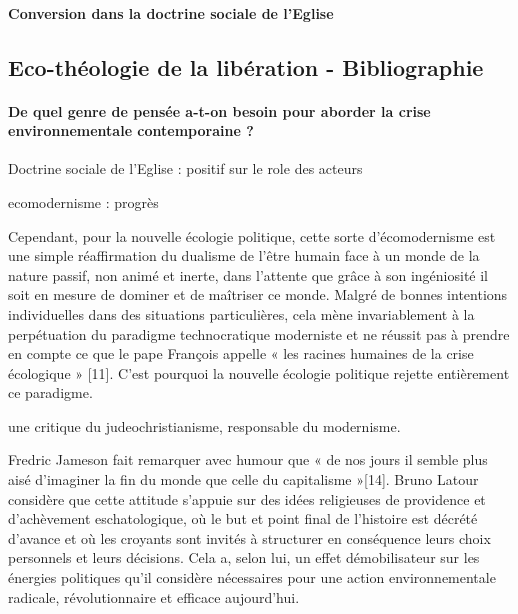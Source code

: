 \paragraph{Conversion dans la doctrine sociale de l'Eglise}
 

\subsection{Eco-théologie de la libération - Bibliographie}
\paragraph{De quel genre de pensée a-t-on besoin pour aborder la crise environnementale contemporaine ? }
        \cite{howles_quel_2022}


\label{Comment:MemoireISTR4}        
   	
    
        Doctrine sociale de l’Eglise : positif sur le role des acteurs

        ecomodernisme : progrès
\begin{singlequote}

        Cependant, pour la nouvelle écologie politique, cette sorte d’écomodernisme est une simple réaffirmation du dualisme de l’être humain face à un monde de la nature passif, non animé et inerte, dans l’attente que grâce à son ingéniosité il soit en mesure de dominer et de maîtriser ce monde. Malgré de bonnes intentions individuelles dans des situations particulières, cela mène invariablement à la perpétuation du paradigme technocratique moderniste et ne réussit pas à prendre en compte ce que le pape François appelle « les racines humaines de la crise écologique » [11]. C’est pourquoi la nouvelle écologie politique rejette entièrement ce paradigme.
\end{singlequote}

        {une critique du judeochristianisme, responsable du modernisme.}
\begin{singlequote}

        Fredric Jameson fait remarquer avec humour que « de nos jours il semble plus aisé d’imaginer la fin du monde que celle du capitalisme »[14]. Bruno Latour considère que cette attitude s’appuie sur des idées religieuses de providence et d’achèvement eschatologique, où le but et point final de l’histoire est décrété d’avance et où les croyants sont invités à structurer en conséquence leurs choix personnels et leurs décisions. Cela a, selon lui, un effet démobilisateur sur les énergies politiques qu’il considère nécessaires pour une action environnementale radicale, révolutionnaire et efficace aujourd’hui.
\end{singlequote}

